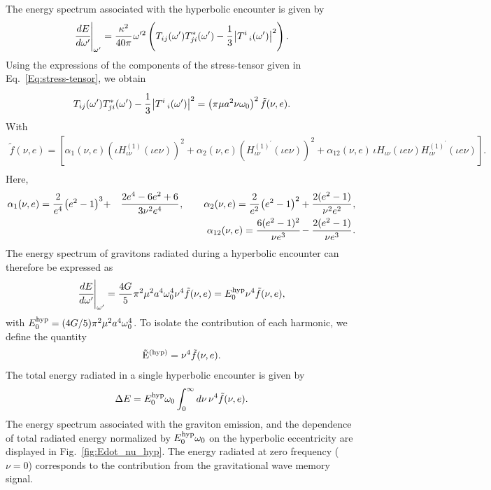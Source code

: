 \documentclass[aps,prd]{revtex4-2}
\begin{document}
The energy spectrum associated with the hyperbolic encounter is given by~\cite{Hait:2022ukn}
\begin{eqnarray}
    \cfrac{dE}{d\omega^{\prime}}\Bigg|_{\omega^{\prime}} = \cfrac{\kappa^2}{40\pi}\,\omega^{\prime2}\left(T_{ij}(\omega^{\prime})T_{ji}^{*}(\omega^{\prime}) - \cfrac{1}{3}\left|T^{i}\,_{i}(\omega^{\prime})\right|^{2}\right).
\end{eqnarray}
Using the expressions of the components of the stress-tensor given in Eq.~\eqref{Eq:stress-tensor}, we obtain 
\begin{eqnarray}
    T_{ij}(\omega^{\prime}) T_{ji}^{*} (\omega^{\prime}) - \cfrac{1}{3}\left|T^{i}\,_{i} (\omega^{\prime})\right|^{2} = \left(\pi \mu a^{2} \nu \omega_{0}\right)^2 \tilde{f}(\nu, e).
\end{eqnarray}
With
\begin{eqnarray}
    \tilde{f}(\nu, e) = \left[\alpha_{1}(\nu, e)\left(\iota H_{\iota\nu}^{(1)}(\iota e\nu)\right)^2 + \alpha_{2}(\nu, e)\left(H_{\iota\nu}^{(1)^{\prime}}(\iota e\nu)\right)^2 + \alpha_{12}(\nu, e)\,\iota H_{\iota\nu}(\iota e\nu)H_{\iota\nu}^{(1)^{\prime}}(\iota e\nu) \right].\nonumber \\
\end{eqnarray}
Here,
\begin{eqnarray}
    \alpha_{1} (\nu, e) = \cfrac{2}{e^4}\left(e^{2} -1 \right)^{3} &+& \cfrac{2e^4 -6e^2 + 6}{3\nu^2 e^4}\,, \qquad  \alpha_{2} (\nu, e) = \cfrac{2}{e^2}\left(e^2 - 1\right)^2 + \cfrac{2(e^2 -1)}{\nu^2 e^2}\,,\nonumber \\ &&  \alpha_{12}(\nu, e) = \cfrac{6(e^2 - 1)^2}{\nu e^3} - \cfrac{2(e^2 - 1)}{\nu e^3}\,.
\end{eqnarray}
The energy spectrum of gravitons radiated during a hyperbolic encounter can therefore be expressed as
\begin{eqnarray}
    \cfrac{dE}{d\omega^{\prime}}\Bigg|_{\omega^{\prime}} = \cfrac{4G}{5}\,\pi^{2} \mu^{2} a^{4} \omega_{0}^{4} \nu^{4}\tilde{f}(\nu, e) = E_{0}^{\rm hyp} \nu^4\tilde{f}(\nu, e),
\end{eqnarray}
with $E_{0}^{\rm hyp} = (4G/5)\pi^{2} \mu^{2} a^{4} \omega_{0}^{4}$. To isolate the contribution of each harmonic, we define the quantity
\begin{eqnarray}
    \tilde{\mathrm E}^{\rm (hyp)} = \nu^{4} \tilde{f}(\nu, e).
\end{eqnarray}
The total energy radiated in a single hyperbolic encounter is given by
\begin{eqnarray}
    \Delta E = E_{0}^{\rm hyp}\omega_{0}\int_{0}^{\infty} d\nu\, \nu^{4}\tilde{f}(\nu, e).
\end{eqnarray}
The energy spectrum associated with the graviton emission, and the dependence of total radiated energy normalized by $E_{0}^{\rm hyp}\omega_{0}$ on the hyperbolic eccentricity are displayed in Fig.~\ref{fig:Edot_nu_hyp}. The energy radiated at zero frequency ($\nu = 0$) corresponds to the contribution from the gravitational wave memory signal.
\end{document}
